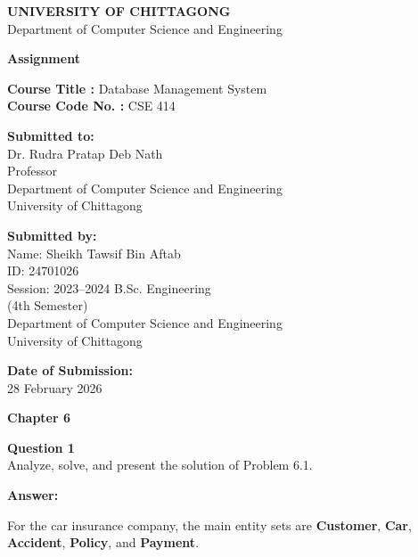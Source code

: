 \documentclass[12pt,a4paper]{article}
\begin{document}
\begin{center}
\textbf{UNIVERSITY OF CHITTAGONG}\\
Department of Computer Science and Engineering
\end{center}

\vspace{1cm}

\begin{center}
\textbf{\Large Assignment}
\end{center}

\vspace{0.8cm}

\textbf{Course Title :} Database Management System\\
\textbf{Course Code No. :} CSE 414

\vspace{1cm}

\textbf{Submitted to:}\\
Dr. Rudra Pratap Deb Nath\\
Professor\\
Department of Computer Science and Engineering\\
University of Chittagong

\vspace{1cm}

\textbf{Submitted by:}\\
Name: Sheikh Tawsif Bin Aftab\\
ID: 24701026\\
Session: 2023--2024 B.Sc. Engineering\\
(4th Semester)\\
Department of Computer Science and Engineering\\
University of Chittagong

\vspace{1cm}

\textbf{Date of Submission:}\\
28 February 2026

\newpage

\begin{center}
\textbf{\Large Chapter 6}
\end{center}

\textbf{Question 1}\\
Analyze, solve, and present the solution of Problem 6.1.

\textbf{Answer:}

For the car insurance company, the main entity sets are \textbf{Customer}, \textbf{Car}, \textbf{Accident}, \textbf{Policy}, and \textbf{Payment}.
\end{document}
